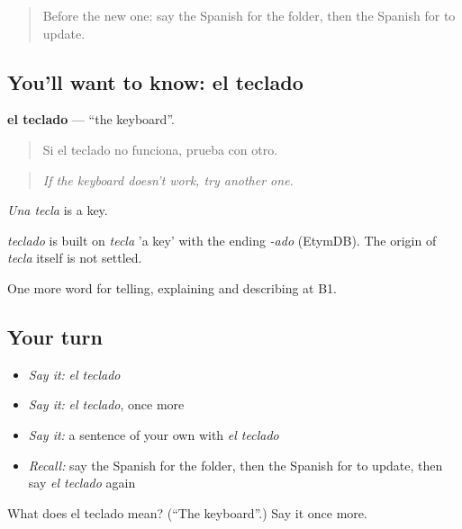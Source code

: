 \label{lesson:ES-C776-teclado}



\begin{quote}
Before the new one: say the Spanish for the folder, then the Spanish for to update.
\end{quote}

\subsection*{You'll want to know: el teclado}
\textbf{el teclado} — \textquotedblleft{}the keyboard\textquotedblright{}.

\begin{quote}
Si el teclado no funciona, prueba con otro.
\end{quote}

\begin{quote}
\emph{If the keyboard doesn't work, try another one.}
\end{quote}

\emph{Una tecla} is a key.

\begin{cousinweb}
\emph{teclado} is built on \emph{tecla} 'a key' with the ending \emph{-ado} (EtymDB). The origin of \emph{tecla} itself is not settled.
\end{cousinweb}

\begin{grammarlens}[title={What you've built}]
One more word for telling, explaining and describing at B1.
\end{grammarlens}

\subsection*{Your turn}
\begin{itemize}
\raggedright
  \item \emph{Say it:} \emph{el teclado}
  \item \emph{Say it:} \emph{el teclado}, once more
  \item \emph{Say it:} a sentence of your own with \emph{el teclado}
  \item \emph{Recall:} say the Spanish for the folder, then the Spanish for to update, then say \emph{el teclado} again
\end{itemize}

\begin{tcolorbox}[breakable,colback=teal!4,colframe=teal!35!black,title={Before you move on}]
What does el teclado mean? (\textquotedblleft{}The keyboard\textquotedblright{}.) Say it once more.
\end{tcolorbox}
